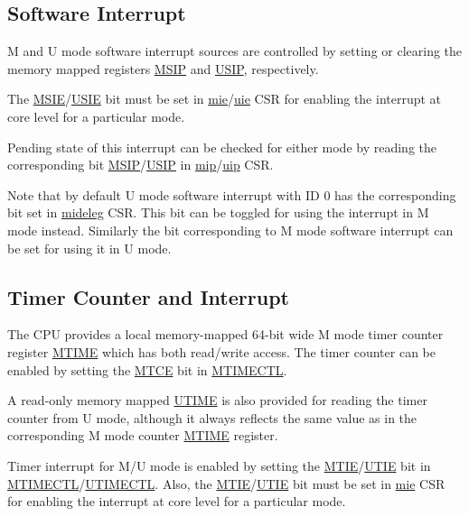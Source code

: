 \documentclass[main\_\_EN.tex]{subfiles}
\begin{document}
\subsection{Software Interrupt}
\label{sec:riscvcpu-clint-software}

M and U mode software interrupt sources are controlled by setting or clearing the memory mapped registers \hyperref[regdesc:CLINTMSIPREG]{MSIP} and \hyperref[regdesc:CLINTUSIPREG]{USIP}, respectively.

The \hyperref[fielddesc:MIEMSIE]{MSIE}/\hyperref[fielddesc:UIEUSIE]{USIE} bit must be set in \hyperref[regdesc:MIE]{mie}/\hyperref[regdesc:UIE]{uie} CSR for enabling the interrupt at core level for a particular mode.

Pending state of this interrupt can be checked for either mode by reading the corresponding bit \hyperref[fielddesc:MIPMSIP]{MSIP}/\hyperref[fielddesc:UIPUSIP]{USIP} in \hyperref[regdesc:MIP]{mip}/\hyperref[regdesc:UIP]{uip} CSR.

Note that by default U mode software interrupt with ID 0 has the corresponding bit set in \hyperref[regdesc:MIDELEG]{mideleg} CSR. This bit can be toggled for using the interrupt in M mode instead. Similarly the bit corresponding to M mode software interrupt can be set for using it in U mode.

\subsection{Timer Counter and Interrupt}
\label{sec:riscvcpu-clint-timer}

The CPU provides a local memory-mapped 64-bit wide M mode timer counter register \hyperref[regdesc:CLINTMTIMEREG]{MTIME} which has both read/write access. The timer counter can be enabled by setting the \hyperref[fielddesc:CLINTMTIMECTLMTCE]{MTCE} bit in  \hyperref[regdesc:CLINTMTIMECTLREG]{MTIMECTL}.

A read-only memory mapped \hyperref[regdesc:CLINTUTIMEREG]{UTIME} is also provided for reading the timer counter from U mode, although it always reflects the same value as in the corresponding M mode counter \hyperref[regdesc:CLINTMTIMEREG]{MTIME} register.

Timer interrupt for M/U mode is enabled by setting the \hyperref[fielddesc:CLINTMTIMECTLMTIE]{MTIE}/\hyperref[fielddesc:CLINTUTIMECTLUTIE]{UTIE} bit in \hyperref[regdesc:CLINTMTIMECTLREG]{MTIMECTL}/\hyperref[regdesc:CLINTUTIMECTLREG]{UTIMECTL}. Also, the \hyperref[fielddesc:MIEMTIE]{MTIE}/\hyperref[fielddesc:UIEUTIE]{UTIE} bit must be set in \hyperref[regdesc:MIE]{mie} CSR for enabling the interrupt at core level for a particular mode.
\end{document}
